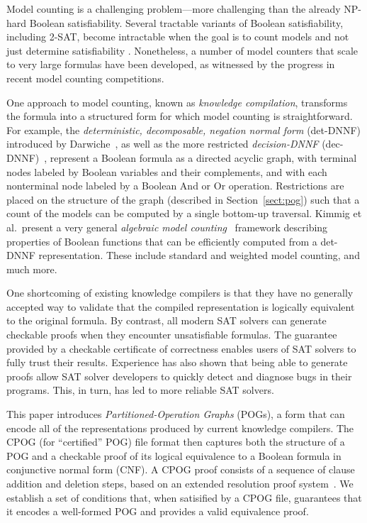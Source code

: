 \documentclass[letterpaper,USenglish,cleveref, autoref, thm-restate]{lipics-v2021}
\begin{document}
Model counting is a challenging problem---more challenging than the
already NP-hard Boolean satisfiability.  Several
tractable variants of Boolean satisfiability, including 2-SAT, become
intractable when the goal is to count models and not just determine
satisfiability \cite{valiant:siam:1979}.  Nonetheless, a number of
model counters that scale to very large formulas have been developed, as
witnessed by the progress in recent model counting competitions.

One approach to model counting, known as \emph{knowledge compilation},
transforms the formula into a structured form for which model counting
is straightforward.  For example, the \emph{deterministic, decomposable, negation normal form}
(det-DNNF) introduced by
Darwiche~\cite{darwiche:aaai:2002,darwiche:ecai:2004}, as well as the more restricted
\emph{decision-DNNF} (dec-DNNF)~\cite{huang:jair:2007,oztok:cp:2014},
represent a
Boolean formula as a directed acyclic graph, with terminal nodes
labeled by Boolean variables and their complements, and with each
nonterminal node labeled by a Boolean And or Or operation.  Restrictions
are placed on the structure of the graph (described in Section~\ref{sect:pog}) such that a count of the
models can be computed by a single bottom-up traversal.
Kimmig et al.\ present a very general {\em
  algebraic model counting}~\cite{kimmig:jal:2017} framework describing
properties of Boolean functions that can be efficiently computed from
a det-DNNF representation.  These include standard and weighted model
counting, and much more.

One shortcoming of existing knowledge compilers is that they have no
generally accepted
way to validate that
the compiled representation is logically equivalent to the original
formula.  By contrast, all modern SAT solvers can generate
checkable proofs when they encounter unsatisfiable formulas.  The
guarantee provided by a checkable certificate of correctness enables
users of SAT solvers to fully trust their results.  Experience has also
shown that being able to generate proofs allow SAT solver developers to quickly
detect and diagnose bugs in their programs. This, in turn, has led
to more reliable SAT solvers.

This paper introduces \emph{Partitioned-Operation Graphs} (POGs),
a form that can encode all of the representations produced by current knowledge
compilers. The CPOG (for ``certified'' POG) file format then
captures both the structure of a POG
and a checkable proof of its logical equivalence to a Boolean formula in
conjunctive normal form (CNF).  A CPOG
proof consists of a sequence of clause addition and deletion steps,
based on an extended resolution proof system~\cite{Tseitin:1983}.
We establish a set of conditions that, when satisified by a CPOG file, guarantees that it
encodes a well-formed POG and provides a valid equivalence proof.
\end{document}
